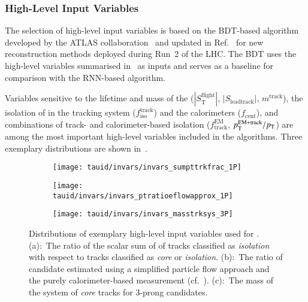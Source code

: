 \subsubsection{High-Level Input Variables}

The selection of high-level input variables is based on the BDT-based
\tauid algorithm developed by the ATLAS
collaboration~\cite{ATL-PHYS-PUB-2015-045} and updated in
Ref.~\cite{cdeutsch-master} for new \tauhadvis reconstruction methods
deployed during Run~2 of the LHC. The BDT \tauid uses the high-level
variables summarised in~ as inputs and
serves as a baseline for comparison with the RNN-based algorithm.

Variables sensitive to the lifetime and mass of the \taulepton
($|S_{\text{T}}^{\text{flight}}|$, $|S_{\text{leadtrack}}|$,
$m^{\text{track}}$), the isolation of \tauhadvis in the tracking
system ($f_{\text{iso}}^{\text{track}}$) and the calorimeters
($f_{\text{cent}}$), and combinations of track- and calorimeter-based
isolation ($f_{\text{track}}^{\text{EM}}$,
$p_{\text{T}}^{\text{EM+track}} / p_{\text{T}}$) are among the most important
high-level variables included in the \tauid algorithms. Three
exemplary distributions are shown in~.


\begin{figure}[htbp]
  \centering

  \begin{subfigure}{0.33\textwidth}
    \texttt{[image: tauid/invars/invars\_sumpttrkfrac\_1P]}
    \subcaption{}
  \end{subfigure}\hfill%
  \begin{subfigure}{0.33\textwidth}
    \texttt{[image: tauid/invars/invars\_ptratioeflowapprox\_1P]}
    \subcaption{}
  \end{subfigure}\hfill%
  \begin{subfigure}{0.33\textwidth}
    \texttt{[image: tauid/invars/invars\_masstrksys\_3P]}
    \subcaption{}
  \end{subfigure}

  \caption[Distributions of exemplary high-level input variables used for
  \tauid.]{Distributions of exemplary high-level input variables used for
    \tauid. (a):~The ratio of the scalar sum of \pT of tracks classified as
    \emph{isolation} with respect to tracks classified as \emph{core} or
    \emph{isolation}. (b):~The ratio of \tauhadvis candidate \pT estimated using
    a simplified particle flow approach and the purely calorimeter-based
    measurement (cf.~). (c):~The mass of the
    system of \emph{core} tracks for 3-prong \tauhadvis candidates.}%
  \label{fig:tauid_high_level_vars}
\end{figure}


